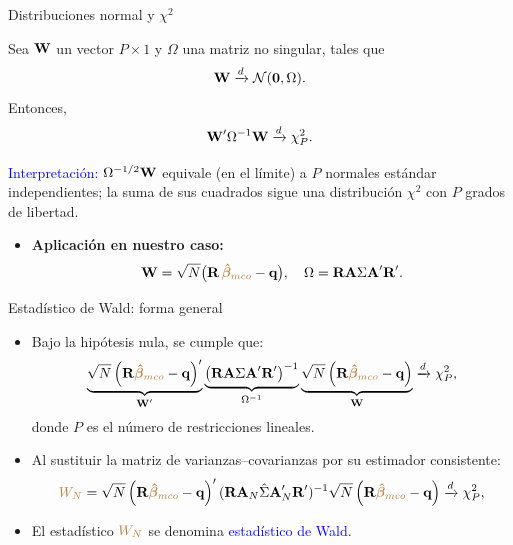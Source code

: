 \documentclass[10pt, xcolor=dvipsnames]{beamer}
\begin{document}
\begin{frame}{Distribuciones normal y $\chi^2$}
\begin{tcolorbox}[colback=white, arc=0mm, boxrule=0.5pt, title=Teorema (distribución de formas cuadráticas), breakable]
    Sea $\textbf{W}$ un vector \(P \times 1\) y \(\Omega\) una matriz no singular, tales que 
    \[
        \textbf{W} \xrightarrow{d} \mathcal{N}(\mathbf{0},\Omega).
    \]
    Entonces,
    \[
        \textbf{W}'\Omega^{-1}\textbf{W} \xrightarrow{d} \chi^2_P.
    \]

    \textcolor{blue}{Interpretación:} \(\Omega^{-1/2}\textbf{W}\) equivale (en el límite) a \(P\) normales estándar independientes; la suma de sus cuadrados sigue una distribución $\chi^2$ con \(P\) grados de libertad.
\end{tcolorbox}
    \pause
\begin{itemize}
    \item \textbf{Aplicación en nuestro caso:} 
    \[
        \textbf{W} = \sqrt{N}\big(\textbf{R}\,\textcolor{brown}{\boldsymbol{\hat{\beta}}_{mco}}-\textbf{q}\big),
        \quad 
        \Omega = \textbf{R}\textbf{A} \Sigma \textbf{A}' \textbf{R}'.
    \]
\end{itemize}
\end{frame}


\begin{frame}{Estadístico de Wald: forma general}
\begin{itemize}
    \item Bajo la hipótesis nula, se cumple que:
    \begin{align*}
    \begin{split}
        \underbrace{\sqrt{N} \left(\textbf{R}\textcolor{brown}{\boldsymbol{\hat{\beta}}_{mco}}-\textbf{q}\right)'}_{\textbf{W}'} \underbrace{ \left(\textbf{R}\textbf{A} \Sigma \textbf{A}'\textbf{R}'\right)^{-1} }_{\Omega^{-1}} \underbrace{ \sqrt{N} \left(\textbf{R}\textcolor{brown}{\boldsymbol{\hat{\beta}}_{mco}}-\textbf{q}\right)}_{\textbf{W}} \xrightarrow{d} \chi^2_P,
    \end{split}
    \end{align*}
    donde $P$ es el número de restricciones lineales. \\ \vspace{0.2cm} 
    \pause
    \item Al sustituir la matriz de varianzas--covarianzas por su estimador consistente:
    \begin{align*}
    \begin{split}
        \textcolor{brown}{W_N} = \sqrt{N} \left(\textbf{R}\textcolor{brown}{\boldsymbol{\hat{\beta}}_{mco}}-\textbf{q}\right)'(\textbf{R} \textbf{A}_N \hat{\Sigma} \textbf{A}'_N \textbf{R}')^{-1} \sqrt{N} \left(\textbf{R}\textcolor{brown}{\boldsymbol{\hat{\beta}}_{mco}}-\textbf{q}\right) \xrightarrow{d} \chi^2_P,
    \end{split}
    \end{align*}
    \item El estadístico \(\textcolor{brown}{W_N}\) se denomina \textcolor{blue}{estadístico de Wald}.
\end{itemize}
\end{frame}
\end{document}
